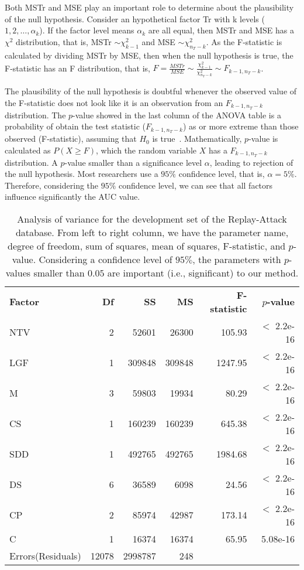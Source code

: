 Both MSTr and MSE play an important role to determine about the plausibility of the null hypothesis. Consider an hypothetical factor {Tr} with k levels ($1,2, \dots, \alpha_{k}$). If the factor level means $\alpha_{k}$ are all equal, then MSTr and MSE has a $\chi^{2}$ distribution, that is, MSTr $\sim \chi^{2}_{k-1}$ and MSE $\sim \chi^{2}_{n_{T}-k}$. As the F-statistic is calculated by dividing MSTr by MSE, then when the null hypothesis is true, the F-statistic has an F distribution, that is, $F=\frac{MSTr}{MSE} \sim \frac{\chi^{2}_{k-1}}{\chi^{2}_{n_{T}-k}} \sim F_{k-1,n_{T}-k}$.

The plausibility of the null hypothesis is doubtful whenever the observed value of the F-statistic does not look like it is an observation from an $F_{k-1,n_{T}-k}$ distribution. 
The $p$-value showed in the last column of the ANOVA table is a probability of obtain the test statistic ($F_{k-1,n_{T}-k}$) as or more extreme than those observed (F-statistic), assuming that $H_{0}$ is true~\cite{Bland:OG:2002}. Mathematically, $p$-value is calculated as $P(X \geq F)$, which the random variable $X$ has a $F_{k-1,n_{T}-k}$ distribution. A $p$-value smaller than a significance level $\alpha$, leading to rejection of the null hypothesis. Most researchers use a $95\%$ confidence level, that is, $\alpha=5\%$. Therefore, considering the $95\%$ confidence level, we can see that all factors influence significantly the AUC value.
%
\begin{table}[!htb]
\centering
\caption{Analysis of variance for the development set of the Replay-Attack database. From left to right column, we have the parameter name, degree of freedom, sum of squares, mean of squares, F-statistic, and $p$-value. Considering a confidence level of $95\%$, the parameters with $p$-values smaller than $0.05$ are important (i.e., significant) to our method.}
\label{table:ANOVAT}
\begin{tabular}{lrrrrr}
\toprule
\textbf{Factor} & \textbf{Df} & \textbf{SS} & \textbf{MS} & \textbf{F-statistic} & \textbf{$\textit{p}$-value} \\
\otoprule
NTV           & 2 &   52601&   26300&  105.93& $<$ 2.2e-16\\
LGF           & 1 &  309848&  309848& 1247.95& $<$ 2.2e-16\\
M             & 3 &   59803&   19934&   80.29& $<$ 2.2e-16\\
CS            & 1 &  160239&  160239&  645.38& $<$ 2.2e-16\\
SDD           & 1 &  492765&  492765& 1984.68& $<$ 2.2e-16\\
DS            & 6 &   36589&    6098&   24.56& $<$ 2.2e-16\\
CP            & 2 &   85974&   42987&  173.14& $<$ 2.2e-16\\
C             & 1 &   16374&   16374&   65.95&  5.08e-16\\
Errors(Residuals)&12078& 2998787&     248 & & \\
\bottomrule
\end{tabular}
\end{table}
